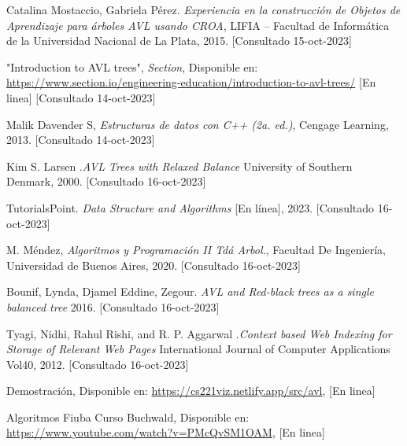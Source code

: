 \documentclass[journal]{IEEEtran}
\begin{document}
\begin{thebibliography}{10}

Catalina Mostaccio, Gabriela Pérez. \textit{Experiencia en la construcción de Objetos de Aprendizaje para árboles AVL usando CROA}, LIFIA – Facultad de Informática de la Universidad Nacional de La Plata, 2015. 
[Consultado 15-oct-2023]

"Introduction to AVL trees", \textit{Section}, Disponible en:
\url{https://www.section.io/engineering-education/introduction-to-avl-trees/} [En linea] 
[Consultado 14-oct-2023]

Malik Davender S, \textit{Estructuras de datos con C++ (2a. ed.)}, Cengage Learning, 2013. 
[Consultado 14-oct-2023]


 Kim S. Larsen .\textit{AVL Trees with Relaxed Balance} University of Southern Denmark, 2000. 
[Consultado 16-oct-2023]

 TutorialsPoint. \textit{Data Structure and Algorithms} [En línea], 2023.
[Consultado 16-oct-2023]

M. Méndez, \textit{Algoritmos y Programación II Tdá Arbol.}, Facultad De Ingeniería, Universidad de Buenos Aires, 2020.
[Consultado 16-oct-2023]

 Bounif, Lynda, Djamel Eddine, Zegour. \textit{AVL and Red-black trees as a single balanced tree} 2016.
[Consultado 16-oct-2023]

 Tyagi, Nidhi, Rahul Rishi, and R. P. Aggarwal .\textit{Context based Web Indexing for Storage of Relevant Web Pages} International Journal of Computer Applications Vol40, 2012.
[Consultado 16-oct-2023]

Demostración, Disponible en: \url{https://cs221viz.netlify.app/src/avl}, [En linea]

Algoritmos Fiuba Curso Buchwald, Disponible en: 
\url{https://www.youtube.com/watch?v=PMcQvSM1OAM}, [En linea] 

\end{thebibliography}
\end{document}
